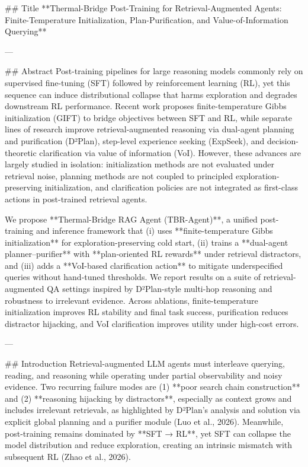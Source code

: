 ## Title  
**Thermal-Bridge Post-Training for Retrieval-Augmented Agents: Finite-Temperature Initialization, Plan-Purification, and Value-of-Information Querying**

---

## Abstract  
Post-training pipelines for large reasoning models commonly rely on supervised fine-tuning (SFT) followed by reinforcement learning (RL), yet this sequence can induce distributional collapse that harms exploration and degrades downstream RL performance. Recent work proposes finite-temperature Gibbs initialization (GIFT) to bridge objectives between SFT and RL, while separate lines of research improve retrieval-augmented reasoning via dual-agent planning and purification (D²Plan), step-level experience seeking (ExpSeek), and decision-theoretic clarification via value of information (VoI). However, these advances are largely studied in isolation: initialization methods are not evaluated under retrieval noise, planning methods are not coupled to principled exploration-preserving initialization, and clarification policies are not integrated as first-class actions in post-trained retrieval agents.  

We propose **Thermal-Bridge RAG Agent (TBR-Agent)**, a unified post-training and inference framework that (i) uses **finite-temperature Gibbs initialization** for exploration-preserving cold start, (ii) trains a **dual-agent planner–purifier** with **plan-oriented RL rewards** under retrieval distractors, and (iii) adds a **VoI-based clarification action** to mitigate underspecified queries without hand-tuned thresholds. We report results on a suite of retrieval-augmented QA settings inspired by D²Plan-style multi-hop reasoning and robustness to irrelevant evidence. Across ablations, finite-temperature initialization improves RL stability and final task success, purification reduces distractor hijacking, and VoI clarification improves utility under high-cost errors.  

---

## Introduction  
Retrieval-augmented LLM agents must interleave querying, reading, and reasoning while operating under partial observability and noisy evidence. Two recurring failure modes are (1) **poor search chain construction** and (2) **reasoning hijacking by distractors**, especially as context grows and includes irrelevant retrievals, as highlighted by D²Plan’s analysis and solution via explicit global planning and a purifier module (Luo et al., 2026). Meanwhile, post-training remains dominated by **SFT → RL**, yet SFT can collapse the model distribution and reduce exploration, creating an intrinsic mismatch with subsequent RL (Zhao et al., 2026).  

